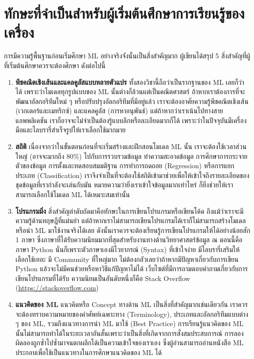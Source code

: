 \section{ทักษะที่จำเป็นสำหรับผู้เริ่มต้นศึกษาการเรียนรู้ของเครื่อง}
\label{sec:skills_for_ml}

การมีความรู้พื้นฐานก่อนเริ่มศึกษา ML อย่างจริงจังนั้นเป็นสิ่งสำคัญมาก ผู้เขียนได้สรุป 5 สิ่งสำคัญที่ผู้ที่เริ่มต้นศึกษาควรจะต้องศึกษา ดังต่อไปนี้
%
\begin{enumerate}[topsep=0pt,noitemsep]\setlength\itemsep{0.5em}
    \item \textbf{พีชคณิตเชิงเส้นและแคลคูลัสแบบหลายตัวแปร} ทั้งสองวิชานี้ถือว่าเป็นรากฐานของ ML เลยก็ว่าได้ เพราะว่าโมเดลทุกรูปแบบของ ML นั้นต่างก็ล้วนแต่เป็นคณิตศาสตร์ ถ้าหากเราต้องการที่จะพัฒนาอัลกอริทึมใหม่ ๆ หรือปรับปรุงอัลกอริทึมที่มีอยู่แล้ว เราจะต้องอาศัยความรู้พีชคณิตเชิงเส้น (เวกเตอร์และเมทริกซ์) และแคลคูลัส (การหาอนุพันธ์) แต่ถ้าหากว่าเราเน้นไปทางสายแอพพลิเคชัน เราก็อาจจะไม่จำเป็นต้องรู้แบบลึกหรือละเอียดมากก็ได้ เพราะว่าในปัจจุบันมีเครื่องมือและไลบรารี่สำเร็จรูปให้เราเลือกใช้มากมาย
    
    \item \textbf{สถิติ} เนื่องจากว่าในขั้นตอนก่อนที่จะเริ่มสร้างและฝึกสอนโมเดล ML นั้น เราจะต้องใช้เวลาส่วนใหญ่ (อาจจะมากถึง 80\%) ไปกับการรวบรวมข้อมูล ทำความสะอาดข้อมูล การศึกษาการกระจายตัวของข้อมูล การตั้งและทดสอบสมมติฐาน การทำการถดถอย (Regression) หรือการแยกประเภท (Classification) เราจึงจำเป็นที่จะต้องใช้สถิติเข้ามาช่วยเพื่อให้เข้าใจถึงรายละเอียดของชุดข้อมูลที่เรากำลังจะเล่นกับมัน หมายความว่ายิ่งเราเข้าใจข้อมูลมากเท่าไหร่ ก็ยิ่งช่วยให้เราสามารถเลือกใช้โมเดล ML ได้เหมาะสมเท่านั้น 
    
    \item \textbf{โปรแกรมมิ่ง} สิ่งสำคัญลำดับถัดมาคือทักษะในการเขียนโปรแกรมหรือเขียนโค้ด ถึงแม้ว่าเราจะมีความรู้ด้านทฤษฎีที่แม่นยำ แต่ถ้าหากเราไม่สามารถเขียนโปรแกรมได้เราก็ไม่สามารถสร้างโมเดลหรือนำ ML มาใช้งานจริงได้เลย ดังนั้นเราควรจะต้องเรียนรู้การเขียนโปรแกรมให้ได้อย่างน้อยสัก 1 ภาษา ซึ่งภาษาที่ได้รับความนิยมมากที่สุดสำหรับงานทางด้านวิทยาศาสตร์ข้อมูล ณ ตอนนี้คือภาษา Python นั่นก็เพราะตัวภาษาเองมีไวยากรณ์ (Syntax) ที่เข้าใจง่าย มีไลบรารี่เสริมให้เลือกใช้เยอะ มี Community ที่ใหญ่มาก ไม่ต้องกลัวเลยว่าถ้าหากมีปัญหาเกี่ยวกับการเขียน Python แล้วจะไม่มีคนช่วยหรือหาวิธีแก้ปัญหาไม่ได้ เว็บไซต์ที่มีการถามตอบคำถามเกี่ยวกับการเขียนโปรแกรมที่ได้รับ    ความนิยมเป็นอันดับหนึ่งก็คือ Stack Overflow (\url{https://stackoverflow.com})
    
    \item \textbf{แนวคิดของ ML} แนวคิดหรือ Concept ทางด้าน ML เป็นสิ่งที่สำคัญมากเช่นเดียวกัน เราควรจะต้องทราบความหมายของคำศัพท์เฉพาะทาง (Terminology), ประเภทและอัลกอริทึมแบบต่าง ๆ ของ ML, รวมถึงแนวทางการนำ ML มาใช้ (Best Practice)
    การเรียนรู้แนวคิดของ ML นั้นไม่สามารถทำได้ในระยะเวลาอันสั้นเพราะว่าเป็นสิ่งที่เกิดจากการสั่งสมประสบการณ์ การลองผิดลองถูกซ้ำไปซ้ำมาจนตกผลึกได้เป็นความเข้าใจของเราเอง ซึ่งผู้อ่านสามารถอ่านหนังสือ ML ประกอบเพื่อใช้เป็นแนวทางในการศึกษาแนวคิดของ ML ได้
    

\end{enumerate}
